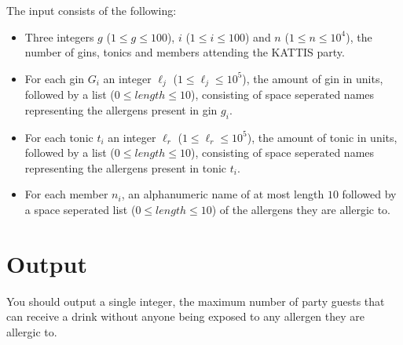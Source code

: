 The input consists of the following:

\begin{itemize}
\item Three integers $g$ ($1 \leq g \leq 100$), $i$ ($1 \leq i \leq 100$) and $n$ ($1 \leq n \leq 10^4$), the number of gins, tonics and members attending the KATTIS party.

\item For each gin $G_i$ an integer $\ell_j$ ($1 \leq \ell_j \leq10^5$), the amount of gin in units, followed by a list ($0 \leq length \leq 10$), consisting of space seperated names representing the allergens present in gin $g_i$.

\item For each tonic $t_i$ an integer $\ell_r$ ($1 \leq \ell_r \leq 10^5$), the amount of tonic in units, followed by a list ($0 \leq length \leq 10$), consisting of space seperated names representing the allergens present in tonic $t_i$.

\item For each member $n_i$, an alphanumeric name of at most length $10$ followed by a space seperated list ($0 \leq length \leq 10$) of the allergens they are allergic to.
\end{itemize}

\section*{Output}

You should output a single integer, the maximum number of party guests that can receive a drink without anyone being exposed to any allergen they are allergic to.
